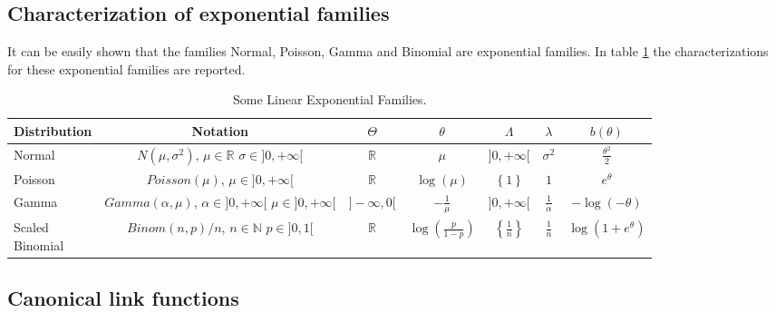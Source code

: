 \documentclass[a4paper, twoside, openright, 12pt]{report}
\theoremstyle{definition}
\theoremstyle{definition}
\theoremstyle{definition}
\theoremstyle{remark}
\begin{document}
\hypertarget{characterization-of-exponential-families}{%
\subsection{Characterization of exponential families}\label{characterization-of-exponential-families}}

It can be easily shown that the families Normal, Poisson, Gamma and Binomial are exponential families. In table \ref{tab:exp-families} the characterizations for these exponential families are reported.

\begin{table}[!h]

\caption{\label{tab:exp-families}Some Linear Exponential Families.}
\centering
\begin{tabular}[t]{lcccccc}
\toprule
\textbf{Distribution} & \textbf{Notation} & \textbf{$\Theta$} & \textbf{$\theta$} & \textbf{$\Lambda$} & \textbf{$\lambda$} & \textbf{$b(\theta)$}\\
\midrule[\heavyrulewidth]
Normal & \makecell[c]{$N(\mu, \sigma^2)$,\\$\mu\in\mathbb{R}$ \\ $\sigma \in ]0, +\infty[$} & $\mathbb{R}$ & $\mu$ & $]0, +\infty[$ & $\sigma^2$ & $\frac{\theta^2}{2}$\\
\addlinespace\hline\addlinespace
Poisson & \makecell[c]{$Poisson(\mu)$,\\$\mu \in ]0, +\infty[$} & $\mathbb{R}$ & $\log{(\mu)}$ & $\left\{1\right\}$ & $1$ & $e^{\theta}$\\
\addlinespace\hline\addlinespace
Gamma & \makecell[c]{$Gamma(\alpha, \mu)$,\\$\alpha \in ]0, +\infty[$ \\ $\mu \in ]0, +\infty[$} & $]-\infty, 0[$ & $-\frac{1}{\mu}$ & $]0,+\infty[$ & $\frac{1}{\alpha}$ & $-\log{\left(-\theta\right)}$\\
\addlinespace\hline\addlinespace
\makecell[l]{Scaled\\Binomial} & \makecell[c]{$Binom(n, p)/n$,\\$n\in\mathbb{N}$ \\ $p\in]0,1[$} & $\mathbb{R}$ & $\log{\left(\frac{p}{1-p}\right)}$ & $\left\{\frac{1}{n}\right\}$ & $\frac{1}{n}$ & $\log\left(1+e^{\theta}\right)$\\
\bottomrule
\end{tabular}
\end{table}

\hypertarget{canonical-link-functions}{%
\subsection{Canonical link functions}\label{canonical-link-functions}}
\end{document}
